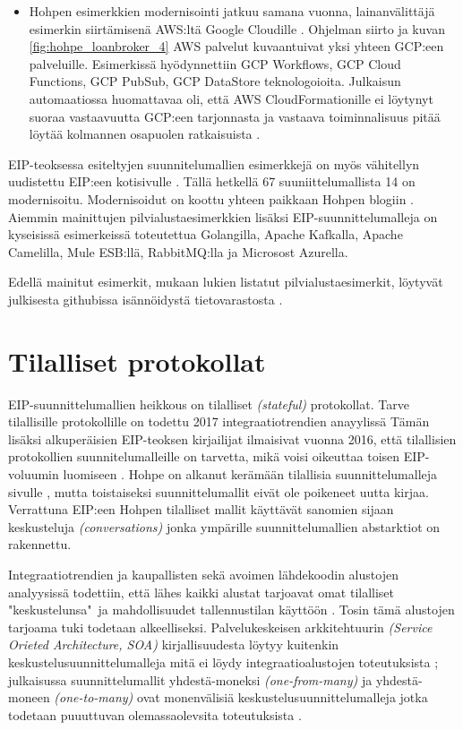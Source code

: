 \begin{itemize}
   \item Hohpen esimerkkien modernisointi jatkuu samana vuonna, lainanvälittäjä esimerkin siirtämisenä AWS:ltä Google Cloudille \citep{HohpeLoanGCP}.
      Ohjelman siirto ja kuvan \ref{fig:hohpe_loanbroker_4} AWS palvelut kuvaantuivat yksi yhteen GCP:een palveluille. Esimerkissä hyödynnettiin GCP Workflows, GCP Cloud Functions, GCP PubSub, GCP DataStore teknologoioita.
      Julkaisun automaatiossa huomattavaa oli, että AWS CloudFormationille ei löytynyt suoraa vastaavuutta GCP:een tarjonnasta ja vastaava toiminnalisuus pitää löytää kolmannen osapuolen ratkaisuista \citep{HohpeLoanGCP}.
   \end{itemize}

   EIP-teoksessa esiteltyjen suunnitelumallien esimerkkejä on myös vähitellyn uudistettu EIP:een kotisivulle \citep{conversationPatterns}. Tällä hetkellä 67 suuniittelumallista 14 on modernisoitu. Modernisoidut on koottu yhteen paikkaan Hohpen blogiin \citep{HohpeModernExamples}. Aiemmin mainittujen pilvialustaesimerkkien lisäksi EIP-suunnittelumalleja on kyseisissä esimerkeissä toteutettua Golangilla, Apache Kafkalla, Apache Camelilla, Mule ESB:llä, RabbitMQ:lla ja Microsost Azurella.
   
   Edellä mainitut esimerkit, mukaan lukien listatut pilvialustaesimerkit, löytyvät julkisesta githubissa isännöidystä tietovarastosta \citep{EIPModernGit}.


\section{Tilalliset protokollat}
EIP-suunnittelumallien heikkous on tilalliset \textit{(stateful)} protokollat. Tarve tilallisille protokollille on todettu 2017 integraatiotrendien anayylissä \citep{Ritter2017} 
Tämän lisäksi alkuperäisien EIP-teoksen kirjailijat ilmaisivat vuonna 2016, että tilallisien protokollien suunnitelumalleille  on tarvetta, mikä voisi oikeuttaa toisen EIP-voluumin luomiseen \citep{Zimmermann2016}.
Hohpe on alkanut kerämään tilallisia suunnittelumalleja sivulle \citep{conversationPatterns}, mutta toistaiseksi suunnittelumallit eivät ole poikeneet uutta kirjaa. Verrattuna EIP:een Hohpen tilalliset mallit käyttävät sanomien sijaan keskusteluja \textit{(conversations)} jonka ympärille suunnittelumallien abstarktiot on rakennettu.


Integraatiotrendien ja kaupallisten sekä avoimen lähdekoodin alustojen  analyysissä todettiin, että lähes kaikki alustat tarjoavat omat tilalliset "keskustelunsa"~ja mahdollisuudet tallennustilan käyttöön \citep{Ritter2017}. Tosin tämä alustojen tarjoama tuki todetaan alkeelliseksi. Palvelukeskeisen arkkitehtuurin \textit{(Service Orieted Architecture, SOA)} kirjallisuudesta löytyy kuitenkin keskustelusuunnittelumalleja mitä ei löydy integraatioalustojen toteutuksista \citep{Ritter2017};
julkaisussa \citep{Barros2005} suunnittelumallit yhdestä-moneksi \textit{(one-from-many)} ja  yhdestä-moneen \textit{(one-to-many)} ovat monenvälisiä keskustelusuunnittelumalleja jotka todetaan puuuttuvan olemassaolevsita toteutuksista \citep{Ritter2017}.

